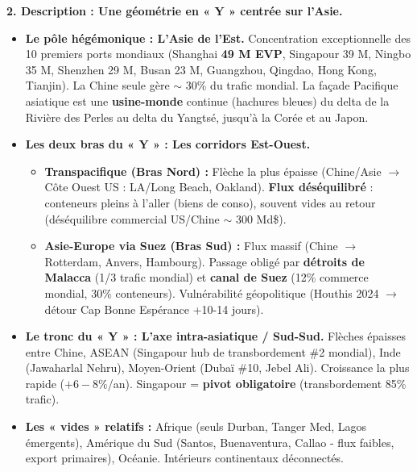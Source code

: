 \documentclass[11pt]{article}
\begin{document}
\begin{exoresolu}
    \textbf{2. Description : Une géométrie en « Y » centrée sur l'Asie.}
    \begin{itemize}
        \item \textbf{Le pôle hégémonique : L'Asie de l'Est.} Concentration exceptionnelle des 10 premiers ports mondiaux (Shanghai \textbf{49 M EVP}, Singapour 39 M, Ningbo 35 M, Shenzhen 29 M, Busan 23 M, Guangzhou, Qingdao, Hong Kong, Tianjin). La Chine seule gère $\sim$ 30\% du trafic mondial. La façade Pacifique asiatique est une \textbf{usine-monde} continue (hachures bleues) du delta de la Rivière des Perles au delta du Yangtsé, jusqu'à la Corée et au Japon.
        \item \textbf{Les deux bras du « Y » : Les corridors Est-Ouest.}
            \begin{itemize}
                \item \textbf{Transpacifique (Bras Nord) :} Flèche la plus épaisse (Chine/Asie $\rightarrow$ Côte Ouest US : LA/Long Beach, Oakland). \textbf{Flux déséquilibré} : conteneurs pleins à l'aller (biens de conso), souvent vides au retour (déséquilibre commercial US/Chine $\sim$ 300 Md\$).
                \item \textbf{Asie-Europe via Suez (Bras Sud) :} Flux massif (Chine $\rightarrow$ Rotterdam, Anvers, Hambourg). Passage obligé par \textbf{détroits de Malacca} (1/3 trafic mondial) et \textbf{canal de Suez} (12\% commerce mondial, 30\% conteneurs). Vulnérabilité géopolitique (Houthis 2024 $\rightarrow$ détour Cap Bonne Espérance +10-14 jours).
            \end{itemize}
        \item \textbf{Le tronc du « Y » : L'axe intra-asiatique / Sud-Sud.} Flèches épaisses entre Chine, ASEAN (Singapour hub de transbordement \#2 mondial), Inde (Jawaharlal Nehru), Moyen-Orient (Dubaï \#10, Jebel Ali). Croissance la plus rapide ($+6-8\%$/an). Singapour = \textbf{pivot obligatoire} (transbordement 85\% trafic).
        \item \textbf{Les « vides » relatifs :} Afrique (seuls Durban, Tanger Med, Lagos émergents), Amérique du Sud (Santos, Buenaventura, Callao - flux faibles, export primaires), Océanie. Intérieurs continentaux déconnectés.
    \end{itemize}
    

\end{exoresolu}
\end{document}
